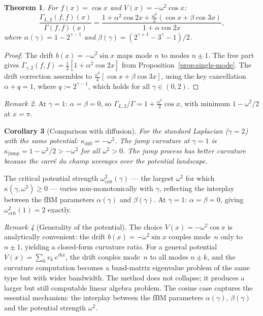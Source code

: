 \documentclass[11pt,a4paper]{article}
\theoremstyle{plain}
\newtheorem{theorem}{Theorem}[section]
\newtheorem{corollary}[theorem]{Corollary}
\theoremstyle{definition}
\theoremstyle{remark}
\newtheorem{remark}[theorem]{Remark}
\begin{document}
\begin{theorem}\label{thm:potential}
For $f(x) = \cos x$ and $V(x) = -\omega^2\cos x$:
\begin{equation}\label{eq:G2-ratio-potential}
  \frac{\Gamma_{L,2}(f,f)(x)}{\Gamma(f,f)(x)}
  = \frac{1 + \alpha^2\cos 2x + \tfrac{\omega^2}{2}(\cos x + \beta\cos 3x)}
         {1 + \alpha\cos 2x},
\end{equation}
where
$\alpha(\gamma) = 1 - 2^{\gamma-1}$ and
$\beta(\gamma) = (2^{\gamma+1} - 3^\gamma - 1)/2$.
\end{theorem}

\begin{proof}
The drift $b(x) = -\omega^2\sin x$ maps mode $n$ to modes $n \pm 1$.
The free part gives
$\Gamma_{\gamma,2}(f,f) = \frac{1}{2}[1 + \alpha^2\cos 2x]$
from Proposition~\ref{prop:single-mode}.
The drift correction assembles to
$\frac{\omega^2}{4}[\cos x + \beta\cos 3x]$,
using the key cancellation $\alpha + q = 1$, where
$q := 2^{\gamma-1}$,
which holds for all $\gamma \in (0,2)$.
\end{proof}

\begin{remark}
At $\gamma = 1$: $\alpha = \beta = 0$, so
$\Gamma_{L,2}/\Gamma = 1 + \frac{\omega^2}{2}\cos x$,
with minimum $1 - \omega^2/2$ at $x = \pi$.
\end{remark}

\begin{corollary}[Comparison with diffusion]\label{cor:comparison}
For the standard Laplacian ($\gamma = 2$) with the same potential:
$\kappa_{\mathrm{diff}} = -\omega^2$.
The jump curvature at $\gamma = 1$ is
$\kappa_{\mathrm{jump}} = 1 - \omega^2/2 > -\omega^2$
for all $\omega^2 > 0$. The jump process has better curvature because
the carr\'e du champ averages over the potential landscape.
\end{corollary}

The critical potential strength $\omega^2_{\mathrm{crit}}(\gamma)$
--- the largest $\omega^2$ for which $\kappa(\gamma,\omega^2) \geq 0$
--- varies non-monotonically with $\gamma$, reflecting the interplay
between the fBM parameters $\alpha(\gamma)$ and $\beta(\gamma)$.
At $\gamma = 1$: $\alpha = \beta = 0$, giving
$\omega^2_{\mathrm{crit}}(1) = 2$ exactly.

\begin{remark}[Generality of the potential]\label{rem:potential-general}
The choice $V(x) = -\omega^2\cos x$ is analytically convenient:
the drift $b(x) = -\omega^2\sin x$ couples mode~$n$ only to
$n \pm 1$, yielding a closed-form curvature ratio.
For a general potential $V(x) = \sum_k v_k\,e^{ikx}$, the drift
couples mode~$n$ to all modes $n \pm k$, and the curvature
computation becomes a band-matrix eigenvalue problem of the same
type but with wider bandwidth. The method does not collapse;
it produces a larger but still computable linear algebra problem.
The cosine case captures the essential mechanism: the interplay
between the fBM parameters $\alpha(\gamma)$, $\beta(\gamma)$ and
the potential strength $\omega^2$.
\end{remark}
\end{document}
